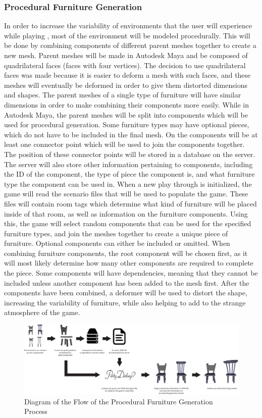 \subsubsection{Procedural Furniture Generation}
In order to increase the variability of environments that the user will experience while playing \ourgame, most of the environment will be modeled procedurally. This will be done by combining components of different parent meshes together to create a new mesh. Parent meshes will be made in Autodesk Maya and be composed of quadrilateral faces (faces with four vertices). The decision to use quadrilateral faces was made because it is easier to deform a mesh with such faces, and these meshes will eventually be deformed in order to give them distorted dimensions and shapes. The parent meshes of a single type of furniture will have similar dimensions in order to make combining their components more easily. While in Autodesk Maya, the parent meshes will be split into components which will be used for procedural generation. Some furniture types may have optional pieces, which do not have to be included in the final mesh. On the components will be at least one connector point which will be used to join the components together. The position of these connector points will be stored in a database on the server. The server will also store other information pertaining to components, including the ID of the component, the type of piece the component is, and what furniture type the component can be used in. When a new play through is initialized, the game will read the scenario files that will be used to populate the game. These files will contain room tags which determine what kind of furniture will be placed inside of that room, as well as information on the furniture components. Using this, the game will select random components that can be used for the specified furniture types, and join the meshes together to create a unique piece of furniture. Optional components can either be included or omitted. When combining furniture components, the root component will be chosen first, as it will most likely determine how many other components are required to complete the piece. Some components will have dependencies, meaning that they cannot be included unless another component has been added to the mesh first. After the components have been combined, a deformer will be used to distort the shape, increasing the variability of furniture, while also helping to add to the strange atmosphere of the game.

\begin{figure}[H]
	\centering\includegraphics[width=0.8\linewidth]{images/proceduralFurnitureProcess_Diagram}
	\caption{Diagram of the Flow of the Procedural Furniture Generation Process}
	\label{fig:furniture}
\end{figure}

